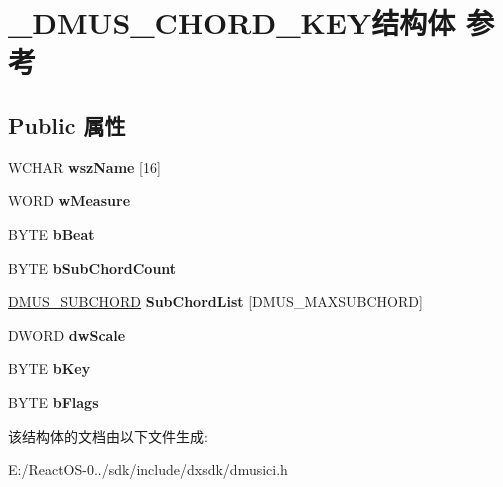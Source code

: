 \hypertarget{struct___d_m_u_s___c_h_o_r_d___k_e_y}{}\section{\+\_\+\+D\+M\+U\+S\+\_\+\+C\+H\+O\+R\+D\+\_\+\+K\+E\+Y结构体 参考}
\label{struct___d_m_u_s___c_h_o_r_d___k_e_y}
\subsection*{Public 属性}
\begin{DoxyCompactItemize}
\item 
\mbox{\label{struct___d_m_u_s___c_h_o_r_d___k_e_y_a08ac117dac6841e3430f1a38fac26e4c}} 
W\+C\+H\+AR {\bfseries wsz\+Name} \mbox{[}16\mbox{]}
\item 
\mbox{\label{struct___d_m_u_s___c_h_o_r_d___k_e_y_a2fb2f2f000d9665bd8e6f64c25fa3a04}} 
W\+O\+RD {\bfseries w\+Measure}
\item 
\mbox{\label{struct___d_m_u_s___c_h_o_r_d___k_e_y_a93a553b7085073de505491a0802c485f}} 
B\+Y\+TE {\bfseries b\+Beat}
\item 
\mbox{\label{struct___d_m_u_s___c_h_o_r_d___k_e_y_ad5362b89b01b4cb51b2f2377e5c33027}} 
B\+Y\+TE {\bfseries b\+Sub\+Chord\+Count}
\item 
\mbox{\label{struct___d_m_u_s___c_h_o_r_d___k_e_y_a77de200064d596955e7b07db279d24b9}} 
\hyperlink{struct___d_m_u_s___s_u_b_c_h_o_r_d}{D\+M\+U\+S\+\_\+\+S\+U\+B\+C\+H\+O\+RD} {\bfseries Sub\+Chord\+List} \mbox{[}D\+M\+U\+S\+\_\+\+M\+A\+X\+S\+U\+B\+C\+H\+O\+RD\mbox{]}
\item 
\mbox{\label{struct___d_m_u_s___c_h_o_r_d___k_e_y_a6d476f0821ae13f2da80e256554af679}} 
D\+W\+O\+RD {\bfseries dw\+Scale}
\item 
\mbox{\label{struct___d_m_u_s___c_h_o_r_d___k_e_y_a48ee3f5472f7473404cfa95882e42235}} 
B\+Y\+TE {\bfseries b\+Key}
\item 
\mbox{\label{struct___d_m_u_s___c_h_o_r_d___k_e_y_a673f79da286cf90f1d800c8b82b0cbef}} 
B\+Y\+TE {\bfseries b\+Flags}
\end{DoxyCompactItemize}


该结构体的文档由以下文件生成\+:\begin{DoxyCompactItemize}
\item 
E\+:/\+React\+O\+S-\/0../sdk/include/dxsdk/dmusici.\+h\end{DoxyCompactItemize}

